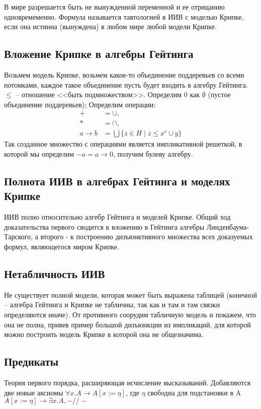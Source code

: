 В мире разрешается быть не вынужденной переменной и ее отрицанию
одновремеменно.
Формула называется тавтологией в ИИВ с моделью Крипке, если она
истинна (вынуждена) в любом мире любой модели Крипке.
\subsection{Вложение Крипке в алгебры Гейтинга}
\label{sec-2-12}
Возьмем модель Крипке, возьмем какое-то объединение поддеревьев
со всеми потомками, каждое такое объединение пусть будет входить
в алгебру Гейтинга. $\le$ -- отношение <<быть подмножеством>>.
Определим $0$ как $\emptyset$ (пустое объединение поддеревьев);
Определим операции:
\begin{align*}
    + &= \cup,\\
    * &= \cap,\\
    a \to b &= \bigcup \{z \in H \mid z \le x^c \cup  y\}
\end{align*}
Так созданное множество с операциями является импликативной
решеткой, в которой мы определим $-a = a \to 0$, получим булеву алгебру.
\subsection{Полнота ИИВ в алгебрах Гейтинга и моделях Крипке}
\label{sec-2-13}
ИИВ полно относительно алгебр Гейтинга и моделей Крипке.
Общий ход доказательства первого сводится к вложению
в Гейтинга алгебры Линденбаума-Тарского, а второго -
к построению дизъюнктивного множества всех доказуемых
формул, являющегося миром Крипке.
\subsection{Нетабличность ИИВ}
\label{sec-2-14}
Не существует полной модели, которая может быть выражена таблицей
(конечной -- алгебра Гейтинга и Крипке не табличны, так как и там и
там связки определяются иначе).
От противного соорудим табличную модель и покажем, что она не полна,
привев пример большой дизъюнкции из импликаций, для которой можно
построить модель Крипке в которой она не общезначима.
\subsection{Предикаты}
\label{sec-2-15}
Теория первого порядка, расширяющая исчисление высказываний.
Добавляются две новые аксиомы
$\forall x.A \to A[x:=\eta]$, где $\eta$ свободна для подстановки в A
$A[x:=\eta] \to \exists x.A, -//-$

